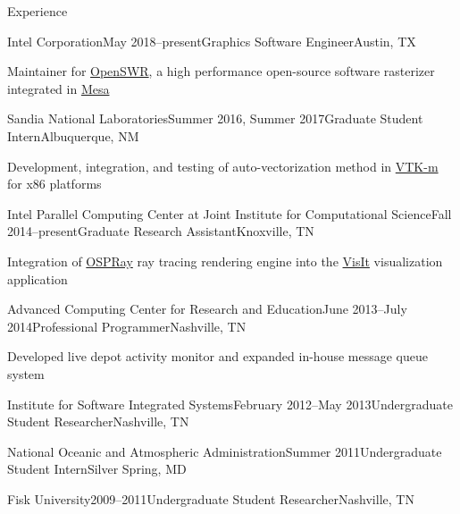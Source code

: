 \documentclass{resume} %
\begin{document}
\begin{rSection}{Experience}

\begin{rSubsection}{Intel Corporation}{May 2018--present}{Graphics Software Engineer}{Austin, TX}
    \item Maintainer for \href{http://openswr.org/}{OpenSWR}, a high performance open-source software rasterizer integrated in \href{https://www.mesa3d.org/}{Mesa}
\end{rSubsection}

\begin{rSubsection}{Sandia National Laboratories}{Summer 2016, Summer 2017}{Graduate Student Intern}{Albuquerque, NM}
    \item Development, integration, and testing of auto-vectorization method in \href{http://m.vtk.org}{VTK-m} for x86 platforms
\end{rSubsection}


\begin{rSubsection}{Intel Parallel Computing Center at Joint Institute for Computational Science}{Fall 2014--present}{Graduate Research Assistant}{Knoxville, TN}
    \item Integration of \href{http://www.ospray.org/}{OSPRay} ray tracing rendering engine into the \href{https://visit.llnl.gov/}{VisIt} visualization application
\end{rSubsection}


\begin{rSubsection}{Advanced Computing Center for Research and Education}{June 2013--July 2014}{Professional Programmer}{Nashville, TN}
\item Developed live depot activity monitor and expanded in-house message queue system
\end{rSubsection}


\begin{rSubsectionNoList}{Institute for Software Integrated Systems}{February 2012--May 2013}{Undergraduate Student Researcher}{Nashville, TN}
\end{rSubsectionNoList}


\begin{rSubsectionNoList}{National Oceanic and Atmospheric Administration}{Summer 2011}{Undergraduate Student Intern}{Silver Spring, MD}
\end{rSubsectionNoList}


\begin{rSubsectionNoList}{Fisk University}{2009--2011}{Undergraduate Student Researcher}{Nashville, TN}
\end{rSubsectionNoList}

\end{rSection}
\end{document}
